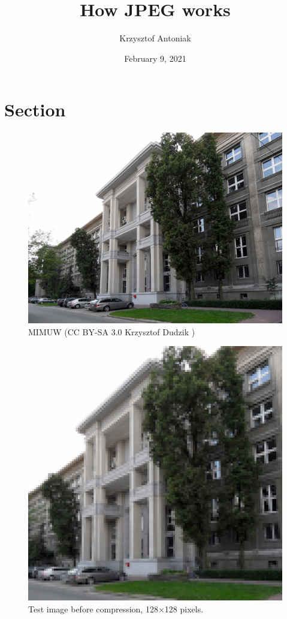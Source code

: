 \documentclass[10pt]{beamer}
\title{How JPEG works}
\date{February 9, 2021}
\author{Krzysztof Antoniak}
\begin{document}
\maketitle

\section{Section}

\begin{frame}[c,plain]
	\begin{figure}
		\centering
		\includegraphics[height=0.6\textwidth]{images/mimuw.jpg}
		\caption{MIMUW (CC BY-SA 3.0 Krzysztof Dudzik \cite{wiki:mimuw})}
	\end{figure}
\end{frame}

\begin{frame}[c,plain]
	\begin{figure}
		\centering
		\includegraphics[height=0.6\textwidth]{images/mimuw-square-128-upscaled.png}
		\caption{Test image before compression, 128$\times$128 pixels.}
	\end{figure}
\end{frame}
\end{document}
